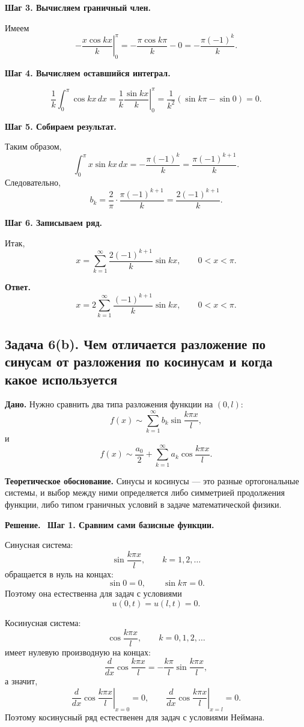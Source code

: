 \documentclass[a4paper,12pt]{article}
\newcommand{\Solution}{\textbf{Решение.}\ }
\begin{document}
\textbf{Шаг 3. Вычисляем граничный член.}

Имеем
\[
\left.-\frac{x\cos kx}{k}\right|_0^{\pi}
=
-\frac{\pi\cos k\pi}{k}-0
=
-\frac{\pi(-1)^k}{k}.
\]

\textbf{Шаг 4. Вычисляем оставшийся интеграл.}

\[
\frac{1}{k}\int_0^{\pi}\cos kx\,dx
=
\frac{1}{k}\left.\frac{\sin kx}{k}\right|_0^{\pi}
=
\frac{1}{k^2}(\sin k\pi-\sin 0)=0.
\]

\textbf{Шаг 5. Собираем результат.}

Таким образом,
\[
\int_0^{\pi}x\sin kx\,dx
=
-\frac{\pi(-1)^k}{k}
=
\frac{\pi(-1)^{k+1}}{k}.
\]
Следовательно,
\[
b_k=\frac{2}{\pi}\cdot \frac{\pi(-1)^{k+1}}{k}
=
\frac{2(-1)^{k+1}}{k}.
\]

\textbf{Шаг 6. Записываем ряд.}

Итак,
\[
x=\sum_{k=1}^{\infty}\frac{2(-1)^{k+1}}{k}\sin kx,
\qquad
0<x<\pi.
\]

\textbf{Ответ.}
\[
x=2\sum_{k=1}^{\infty}\frac{(-1)^{k+1}}{k}\sin kx,
\qquad
0<x<\pi.
\]

\subsection*{Задача 6(b). Чем отличается разложение по синусам от разложения по косинусам и когда какое используется}

\textbf{Дано.}
Нужно сравнить два типа разложения функции на $(0,l)$:
\[
f(x)\sim \sum_{k=1}^{\infty}b_k\sin\frac{k\pi x}{l},
\]
и
\[
f(x)\sim \frac{a_0}{2}+\sum_{k=1}^{\infty}a_k\cos\frac{k\pi x}{l}.
\]

\textbf{Теоретическое обоснование.}
Синусы и косинусы --- это разные ортогональные системы, и выбор между ними определяется либо симметрией продолжения функции, либо типом граничных условий в задаче математической физики.

\Solution
\textbf{Шаг 1. Сравним сами базисные функции.}

Синусная система:
\[
\sin\frac{k\pi x}{l},
\qquad
k=1,2,\dots
\]
обращается в нуль на концах:
\[
\sin 0=0,
\qquad
\sin k\pi=0.
\]
Поэтому она естественна для задач с условиями
\[
u(0,t)=u(l,t)=0.
\]

Косинусная система:
\[
\cos\frac{k\pi x}{l},
\qquad
k=0,1,2,\dots
\]
имеет нулевую производную на концах:
\[
\frac{d}{dx}\cos\frac{k\pi x}{l}
=
-\frac{k\pi}{l}\sin\frac{k\pi x}{l},
\]
а значит,
\[
\left.\frac{d}{dx}\cos\frac{k\pi x}{l}\right|_{x=0}
=0,
\qquad
\left.\frac{d}{dx}\cos\frac{k\pi x}{l}\right|_{x=l}
=0.
\]
Поэтому косинусный ряд естественен для задач с условиями Неймана.
\end{document}
